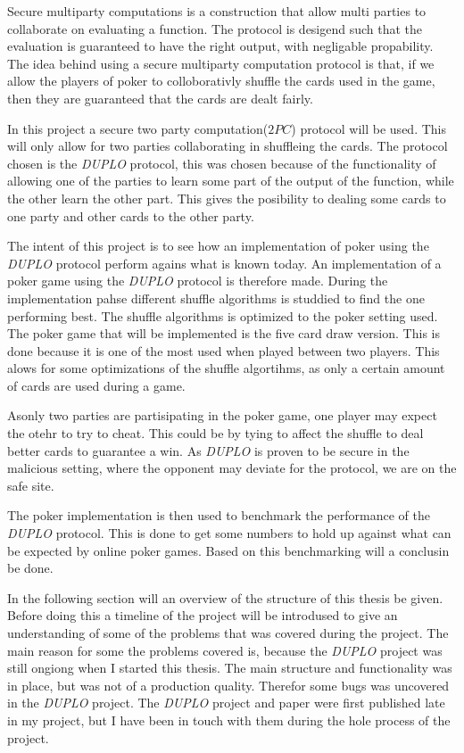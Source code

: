 \documentclass[twoside,11pt,openright]{report}
\newcommand{\DUPLO}{\textit{DUPLO} }
\begin{document}
Secure multiparty computations is a construction that allow multi parties to collaborate on evaluating a function. The protocol is desigend such that the evaluation is guaranteed to have the right output, with negligable propability. The idea behind using a secure multiparty computation protocol is that, if we allow the players of poker to colloborativly shuffle the cards used in the game, then they are guaranteed that the cards are dealt fairly.

In this project a secure two party computation($2PC$) protocol will be used. This will only allow for two parties collaborating in shuffleing the cards. The protocol chosen is the \DUPLO protocol, this was chosen because of the functionality of allowing one of the parties to learn some part of the output of the function, while the other learn the other part. This gives the posibility to dealing some cards to one party and other cards to the other party.

The intent of this project is to see how an implementation of poker using the \DUPLO protocol perform agains what is known today. An implementation of a poker game using the \DUPLO protocol is therefore made. During the implementation pahse different shuffle algorithms is studdied to find the one performing best. The shuffle algorithms is optimized to the poker setting used. The poker game that will be implemented is the five card draw version. This is done because it is one of the most used when played between two players. This alows for some optimizations of the shuffle algortihms, as only a certain amount of cards are used during a game.

Asonly two parties are partisipating in the poker game, one player may expect the otehr to try to cheat. This could be by tying to affect the shuffle to deal better cards to guarantee a win. As \DUPLO is proven to be secure in the malicious setting, where the opponent may deviate for the protocol, we are on the safe site.

The poker implementation is then used to benchmark the performance of the \DUPLO protocol. This is done to get some numbers to hold up against what can be expected by online poker games. Based on this benchmarking will a conclusin be done.

\bigskip

In the following section will an overview of the structure of this thesis be given. Before doing this a timeline of the project will be introdused to give an understanding of some of the problems that was covered during the project. The main reason for some the problems covered is, because the \DUPLO project was still ongiong when I started this thesis. The main structure and functionality was in place, but was not of a production quality. Therefor some bugs was uncovered in the \DUPLO project. The \DUPLO project and paper were first published late in my project, but I have been in touch with them during the hole process of the project.
\end{document}
